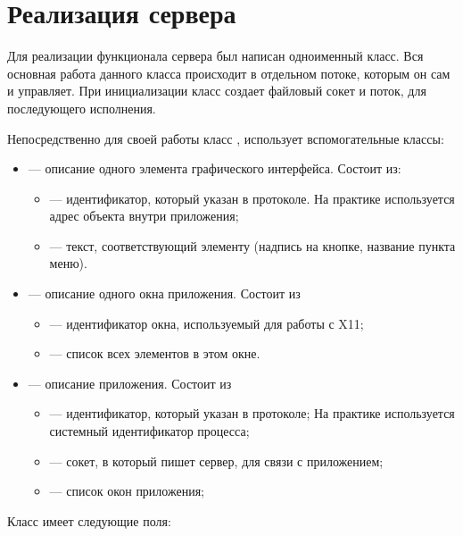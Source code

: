 \section{Реализация сервера}

Для реализации функционала сервера был написан одноименный класс. Вся
основная работа данного класса происходит в отдельном потоке, которым он сам и
управляет. При инициализации класс создает файловый сокет и поток, для
последующего исполнения.

Непосредственно для своей работы класс , использует вспомогательные
классы:
\begin{itemize}
    \item {} — описание одного элемента графического интерфейса.
        Состоит из:
        \begin{itemize}
            \item {} — идентификатор, который указан в протоколе. На
                практике используется адрес объекта внутри приложения;
            \item {} — текст, соответствующий элементу (надпись на
                кнопке, название пункта меню).
        \end{itemize}

    \item {} — описание одного окна приложения. Состоит из
        \begin{itemize}
        \item {} — идентификатор окна, используемый для работы с X11;
        \item {} — список всех элементов в этом окне.
        \end{itemize}

    \item {} — описание приложения. Состоит из
        \begin{itemize}
        \item {} — идентификатор, который указан в протоколе; На
            практике используется системный идентификатор процесса;
        \item {} — сокет, в который пишет сервер, для связи с
            приложением;
        \item {} — список окон приложения;
        \end{itemize}
\end{itemize}

Класс  имеет следующие поля:

